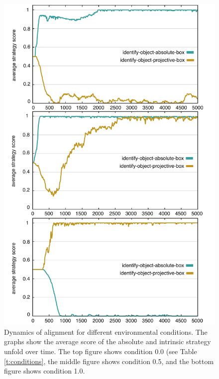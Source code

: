 \begin{figure}
\begin{center}
\includegraphics[width=0.8\columnwidth]{figs/chunk-alignment-frames-absolute-vs-intrinsic-together}
\end{center}
\caption[Dynamics of alignment for different environmental conditions]{%
Dynamics of alignment for different environmental conditions. 
The graphs show the average score of the absolute and intrinsic strategy 
unfold over time. The top figure shows condition 0.0 (see Table 
\ref{t:conditions}, the middle figure shows 
condition 0.5, and the bottom figure shows condition 1.0.}
\label{f:chunk-alignment-frames-absolute-vs-intrinsic-detail}
\end{figure}

